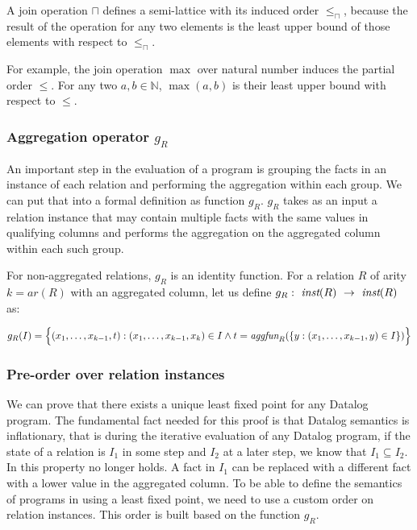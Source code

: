 A join operation $\sqcap$ defines a semi-lattice with its induced order $\le_\sqcap$, because the result of the operation for any two elements is the least upper bound of those elements with respect to $\le_\sqcap$.

For example, the join operation $\max$ over natural number induces the partial order $\le$. For any two $a, b \in \mathbb{N}$, $\max(a, b)$ is their least upper bound with respect to $\le$.

\subsubsection{Aggregation operator $g_R$}
An important step in the evaluation of a \datalogra program is grouping the facts in an instance of each relation and performing the aggregation within each group. We can put that into a formal definition as function $g_R$. $g_R$ takes as an input a relation instance that may contain multiple facts with the same values in  qualifying columns and performs the aggregation on the aggregated column within each such group.
\begin{defn}\label{d:aggregationoperationgr}
For non-aggregated relations, $g_R$ is an identity function. For a relation $R$ of arity $k = ar(R)$ with an aggregated column, let us define $g_R:~\textit{inst}(R)~\to~\textit{inst}(R)$ as:  

$$g_R(I) = 
       \Big\{(x_1, \dots, x_{k-1}, t): (x_1, \dots, x_{k-1}, x_k) \in I \wedge t = \textit{aggfun}_R(\{y: (x_1, \dots, x_{k-1}, y) \in I\})\Big\}
$$
\end{defn}

\subsubsection{Pre-order over relation instances}
We can prove that there exists a unique least fixed point for any Datalog program. The fundamental fact needed for this proof is that Datalog semantics is inflationary, that is during the iterative evaluation of any Datalog program, if the state of a relation is $I_1$ in some step and $I_2$ at a later step, we know that $I_1 \subseteq I_2$. In \datalogra this property no longer holds. A fact in $I_1$ can be replaced with a different fact with a lower value in the aggregated column. To be able to define the semantics of programs in \datalogra using a least fixed point, we need to use a custom order on relation instances. This order is built based on the function $g_R$.

